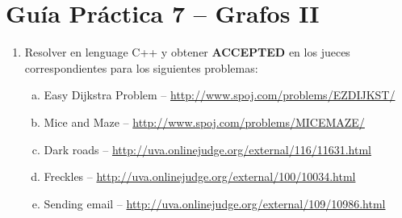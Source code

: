 




\section*{Gu\'ia Pr\'actica 7 -- Grafos II}

\begin{enumerate}[1 -]
	
	\item Resolver en lenguage C++ y obtener \textbf{ACCEPTED} en los jueces correspondientes para los siguientes problemas:
	
	\begin{enumerate}[a)]
		\item Easy Dijkstra Problem -- \href{http://www.spoj.com/problems/EZDIJKST/}{http://www.spoj.com/problems/EZDIJKST/}
		\item Mice and Maze -- \href{http://www.spoj.com/problems/MICEMAZE/}{http://www.spoj.com/problems/MICEMAZE/}
		\item Dark roads -- \href{http://uva.onlinejudge.org/external/116/11631.html}{http://uva.onlinejudge.org/external/116/11631.html}		
		\item Freckles -- \href{http://uva.onlinejudge.org/external/100/10034.html}{http://uva.onlinejudge.org/external/100/10034.html}
		\item Sending email -- \href{http://uva.onlinejudge.org/external/109/10986.html}{http://uva.onlinejudge.org/external/109/10986.html}
	\end{enumerate}
\end{enumerate}

